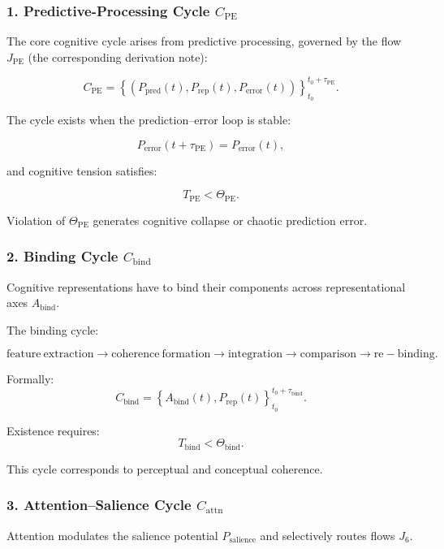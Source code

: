 \subsubsection{1. Predictive-Processing Cycle $C_{\mathrm{PE}}$}

The core cognitive cycle arises from predictive processing, governed by
the flow $J_{\mathrm{PE}}$ (the corresponding derivation note):

\[
 C_{\mathrm{PE}} = 
 \left\{
   (P_{\mathrm{pred}}(t),
    P_{\mathrm{rep}}(t),
    P_{\mathrm{error}}(t))
 \right\}_{t_0}^{t_0+\tau_{\mathrm{PE}}}.
\]

The cycle exists when the prediction–error loop is stable:

\[
 P_{\mathrm{error}}(t+\tau_{\mathrm{PE}}) = P_{\mathrm{error}}(t),
\]

and cognitive tension satisfies:

\[
 T_{\mathrm{PE}} < \Theta_{\mathrm{PE}}.
\]

Violation of $\Theta_{\mathrm{PE}}$ generates cognitive collapse or chaotic
prediction error.

\subsubsection{2. Binding Cycle $C_{\mathrm{bind}}$}

Cognitive representations have to bind their components across
representational axes $A_{\mathrm{bind}}$.

The binding cycle:

\[
 \mathrm{feature\ extraction}
 \to
 \mathrm{coherence\ formation}
 \to
 \mathrm{integration}
 \to
 \mathrm{comparison}
 \to
 \mathrm{re-binding}.
\]

Formally:
\[
 C_{\mathrm{bind}} =
 \left\{
   A_{\mathrm{bind}}(t), P_{\mathrm{rep}}(t)
 \right\}_{t_0}^{t_0+\tau_{\mathrm{bind}}}.
\]

Existence requires:
\[
 T_{\mathrm{bind}} < \Theta_{\mathrm{bind}}.
\]

This cycle corresponds to perceptual and conceptual coherence.

\subsubsection{3. Attention–Salience Cycle $C_{\mathrm{attn}}$}

Attention modulates the salience potential $P_{\mathrm{salience}}$ and
selectively routes flows $J_6$.


